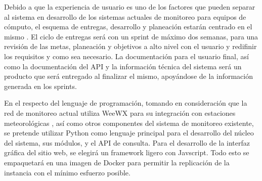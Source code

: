 
Debido a que la experiencia de usuario es uno de los factores que pueden separar al sistema en desarrollo de los sistemas actuales de monitoreo para equipos de cómputo, el esquema de entregas, desarrollo y planeación estarán centrado en el mismo \cite{hussain_agile_usercentered}. El ciclo de entregas será con un sprint de máximo dos semanas, para una revisión de las metas, planeación y objetivos a alto nivel con el usuario y redifinir los requisitos y como sea necesario. La documentación para el usuario final, así como la documentación del API y la información técnica del sistema será un producto que será entregado al finalizar el mismo, apoyándose de la información generada en los sprints.



En el respecto del lenguaje de programación, tomando en consideración que la red de monitoreo actual utiliza WeeWX para su integración con estaciones meteorológicas \cite{red_climatologica_uacj}, así como otros componentes del sistema de monitoreo existente, se pretende utilizar Python como lenguaje principal para el desarrollo del núcleo del sistema, sus módulos, y el API de consulta. Para el desarrollo de la interfaz gráfica del sitio web, se elegirá un framework ligero con Javscript. Todo esto se empaquetará en una imagen de Docker para permitir la replicación de la instancia con el mínimo esfuerzo posible.

